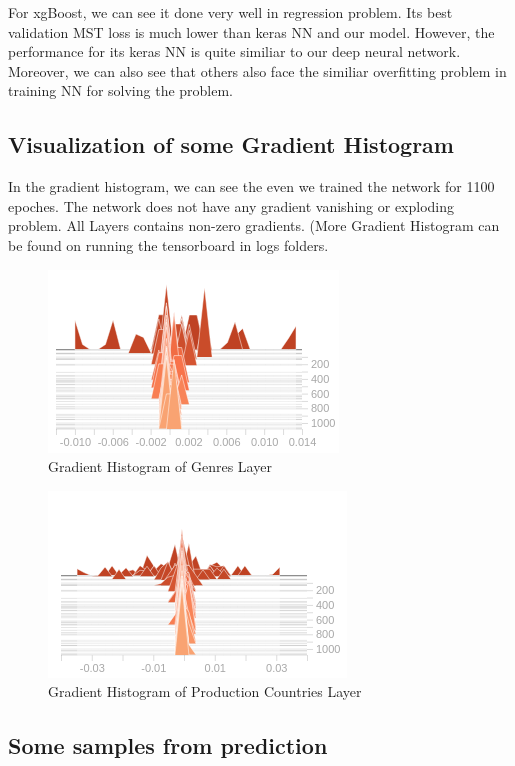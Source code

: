 \documentclass{article}
\begin{document}
For xgBoost, we can see it done very well in regression problem. Its best validation MST loss is much lower than keras NN and our model. However, the performance for its keras NN is quite similiar to our deep neural network. Moreover, we can also see that others also face the similiar overfitting problem in training NN for solving the problem.


\subsection{Visualization of some Gradient Histogram }

In the gradient histogram, we can see the even we trained the network for 1100 epoches. The network does not have any gradient vanishing or exploding problem. All Layers contains non-zero gradients. (More Gradient Histogram can be found on running the tensorboard in logs folders.
\begin{figure}[h]
  \centering
  \includegraphics[scale=1]{linear_1.png}
  \caption{Gradient Histogram of Genres Layer}
\end{figure}

\begin{figure}[h]
  \centering
  \includegraphics[scale=1]{linear_2.png}
  \caption{Gradient Histogram of Production Countries Layer}
\end{figure}

\pagebreak


\subsection{Some samples from prediction}
\end{document}
